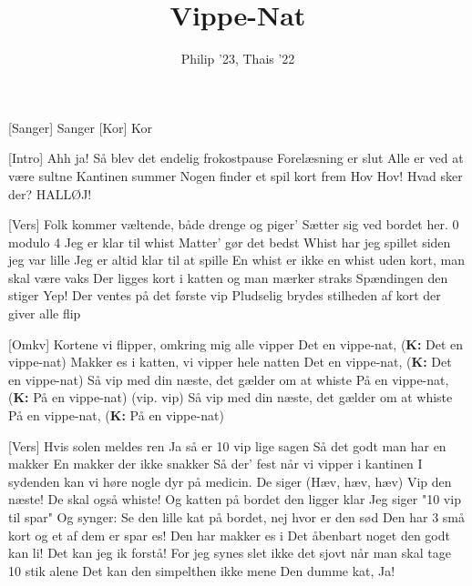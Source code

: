 \documentclass[a4paper,11pt]{article}
\title{Vippe-Nat}
\author{Philip '23, Thais '22}
\begin{document}
\maketitle

\begin{roles}
[Sanger] Sanger
[Kor] Kor
\end{roles}

\begin{song}
    [Intro] Ahh ja!
                Så blev det endelig frokostpause
                Forelæsning er slut
                Alle er ved at være sultne
                Kantinen summer
                Nogen finder et spil kort frem
                Hov Hov! Hvad sker der?
                HALLØJ!
    
    [Vers] Folk kommer væltende, både drenge og piger'
                Sætter sig ved bordet her. 0 modulo 4
                Jeg er klar til whist
                Matter' gør det bedst
                Whist har jeg spillet siden jeg var lille 
                Jeg er altid klar til at spille
                En whist er ikke en whist uden kort, man skal være vaks
                Der ligges kort i katten og man mærker straks
                Spændingen den stiger
                Yep!
                Der ventes på det første vip
                Pludselig brydes stilheden af kort der giver alle flip

    [Omkv] Kortene vi flipper, omkring mig alle vipper
                Det en vippe-nat, (\textbf{K:} Det en vippe-nat)
                Makker es i katten, vi vipper hele natten
                Det en vippe-nat, (\textbf{K:} Det en vippe-nat)
                Så vip med din næste, det gælder om at whiste
                På en vippe-nat, (\textbf{K:} På en vippe-nat) (vip. vip)
                Så vip med din næste, det gælder om at whiste
                På en vippe-nat, (\textbf{K:} På en vippe-nat)

    [Vers] Hvis solen meldes ren
                Ja så er 10 vip lige sagen
                Så det godt man har en makker 
                En makker der ikke snakker
                Så der' fest når vi vipper i kantinen 
                I sydenden kan vi høre nogle dyr på medicin. 
                De siger (Hæv, hæv, hæv)
                Vip den næste!
                De skal også whiste!
                Og katten på bordet den ligger klar
                Jeg siger "10 vip til spar"
                Og synger:
                Se den lille kat på bordet, nej hvor er den sød
                Den har 3 små kort og et af dem er spar es!
                Den har makker es i
                Det åbenbart noget den godt kan li!
                Det kan jeg ik forstå!
                For jeg synes slet ikke det sjovt når man skal tage 10 stik alene 
                Det kan den simpelthen ikke mene
                Den dumme kat, Ja!


\end{song}
\end{document}

